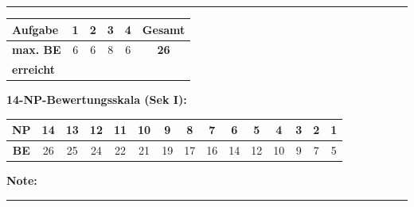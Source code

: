 \documentclass[11pt, a4paper]{article}
\newcommand{\luecke}[1]{\rule{#1}{0.4pt}}
\begin{document}

\vspace{25pt}
\hrule
\vspace{10pt}

\noindent
\begin{tabularx}{\textwidth}{|X|c|c|c|c||c|}
\hline
\textbf{Aufgabe} & 1 & 2 & 3 & 4 & \textbf{Gesamt} \\
\hline
\textbf{max. BE} & 6 & 6 & 8 & 6 & \textbf{26} \\
\hline
\textbf{erreicht} & & & & & \\[0.8em]
\hline
\end{tabularx}

\vspace{15pt}


\noindent\textbf{14-NP-Bewertungsskala (Sek I):}

\vspace{0.5em}

\noindent
\begin{tabularx}{\textwidth}{|c|c|c|c|c|c|c|c|c|c|c|c|c|c|c|}
\hline
\textbf{NP} & 14 & 13 & 12 & 11 & 10 & 9 & 8 & 7 & 6 & 5 & 4 & 3 & 2 & 1 \\
\hline
\textbf{BE} & 26 & 25 & 24 & 22 & 21 & 19 & 17 & 16 & 14 & 12 & 10 & 9 & 7 & 5 \\
\hline
\end{tabularx}

\vspace{10pt}

\begin{flushright}
\textbf{Note:} \luecke{2cm}
\end{flushright}
\end{document}
